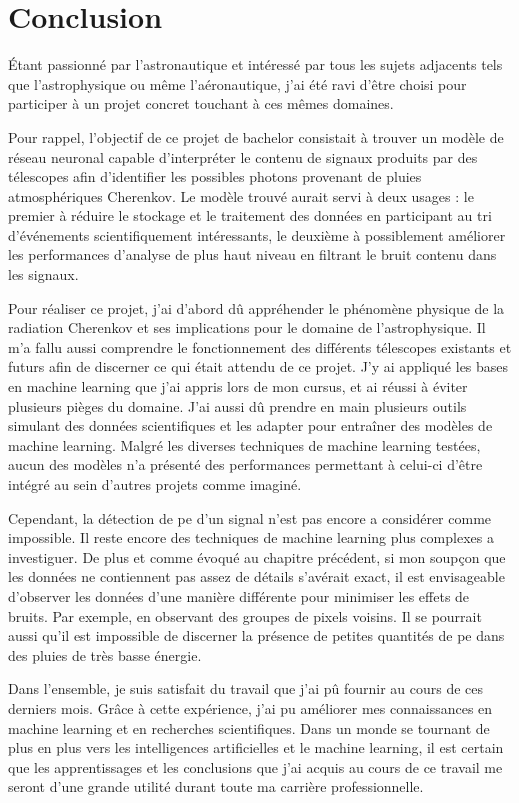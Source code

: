\chapter*{Conclusion}


Étant passionné par l'astronautique et intéressé par tous les sujets adjacents tels que l'astrophysique ou même l'aéronautique, 
j'ai été ravi d'être choisi pour participer à un projet concret touchant à ces mêmes domaines.

Pour rappel, l'objectif de ce projet de bachelor consistait à trouver un modèle de réseau neuronal capable d'interpréter 
le contenu de signaux produits par des télescopes afin d'identifier les possibles photons provenant de pluies atmosphériques Cherenkov.
Le modèle trouvé aurait servi à deux usages : le premier à réduire le stockage et le traitement des données en participant 
au tri d'événements scientifiquement intéressants, le deuxième à possiblement améliorer les performances d'analyse de plus haut niveau 
en filtrant le bruit contenu dans les signaux. 

Pour réaliser ce projet, j'ai d'abord dû appréhender le phénomène physique de la radiation Cherenkov et ses implications pour le domaine de l'astrophysique.
Il m'a fallu aussi comprendre le fonctionnement des différents télescopes existants et futurs afin de discerner 
ce qui était attendu de ce projet. J'y ai appliqué les bases en machine learning que j'ai appris lors de mon cursus, et ai 
réussi à éviter plusieurs pièges du domaine. J'ai aussi dû prendre en main plusieurs outils simulant des données scientifiques et les adapter
pour entraîner des modèles de machine learning. Malgré les diverses techniques de machine learning testées,
aucun des modèles n'a présenté des performances permettant à celui-ci d'être intégré au sein d'autres projets comme imaginé.

Cependant, la détection de \gls{pe} d'un signal n'est pas encore a considérer comme impossible. 
Il reste encore des techniques de machine learning plus complexes a investiguer. 
De plus et comme évoqué au chapitre précédent, si mon soupçon que les données ne contiennent pas assez de détails s'avérait exact, il est envisageable d'observer
les données d'une manière différente pour minimiser les effets de bruits. Par exemple, en observant des groupes de pixels voisins. 
Il se pourrait aussi qu'il est impossible de discerner la présence de petites quantités de \gls{pe} dans des pluies de très basse énergie.

Dans l'ensemble, je suis satisfait du travail que j'ai pû fournir au cours de ces derniers mois.
Grâce à cette expérience, j'ai pu améliorer mes connaissances en machine learning et en recherches scientifiques.
Dans un monde se tournant de plus en plus vers les intelligences artificielles et le machine learning,
il est certain que les apprentissages et les conclusions que j'ai acquis au cours de ce travail me seront d'une 
grande utilité durant toute ma carrière professionnelle.